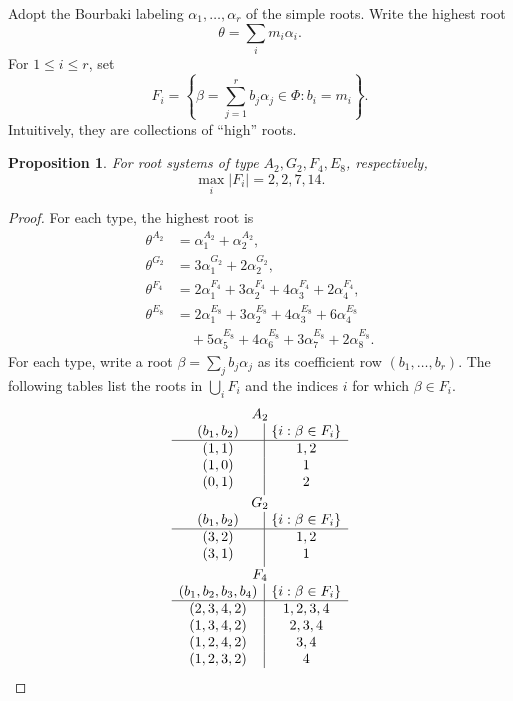 \documentclass[12pt]{article}
\newtheorem{proposition}[theorem]{Proposition}
\theoremstyle{definition}
\begin{document}
Adopt the Bourbaki labeling $\alpha_1,\ldots,\alpha_r$ of the simple roots. Write the highest root $$\theta=\sum_i m_i\alpha_i.$$ For $1\le i\le r$, set
\[
    F_i=\left\{\beta=\sum_{j=1}^r b_j\alpha_j\in\Phi:b_i=m_i\right\}.
\]
Intuitively, they are collections of ``high'' roots.
\begin{proposition}\label{rootcounts}
    For root systems of type $A_2,G_2,F_4,E_8$, respectively, $$\max_i|F_i|=2,2,7,14.$$
\end{proposition}
\begin{proof}
    For each type, the highest root is
    \[
    \begin{aligned}
        \theta^{A_2}
            &=\alpha_1^{A_2}+\alpha_2^{A_2},\\
        \theta^{G_2}
            &=3\alpha_1^{G_2}+2\alpha_2^{G_2},\\
        \theta^{F_4}
            &=2\alpha_1^{F_4}+3\alpha_2^{F_4}
              +4\alpha_3^{F_4}+2\alpha_4^{F_4},\\
        \theta^{E_8}
            &=2\alpha_1^{E_8}+3\alpha_2^{E_8}
              +4\alpha_3^{E_8}+6\alpha_4^{E_8}\\
            &\quad+5\alpha_5^{E_8}+4\alpha_6^{E_8}
              +3\alpha_7^{E_8}+2\alpha_8^{E_8}.
    \end{aligned}
    \]
    For each type, write a root $\beta=\sum_j b_j\alpha_j$ as its coefficient row $(b_1,\ldots,b_r)$. The following tables list the roots in $\bigcup_iF_i$ and the indices $i$ for which $\beta\in F_i$.
    {\small
    \[
    \begin{array}{c|c}
    \multicolumn{2}{c}{A_2}\\
    (b_1,b_2)&\{i:\beta\in F_i\}\\ \hline
    (1,1)&1,2\\
    (1,0)&1\\
    (0,1)&2\\[3pt]
    \multicolumn{2}{c}{G_2}\\
    (b_1,b_2)&\{i:\beta\in F_i\}\\ \hline
    (3,2)&1,2\\
    (3,1)&1\\[3pt]
    \multicolumn{2}{c}{F_4}\\
    (b_1,b_2,b_3,b_4)&\{i:\beta\in F_i\}\\ \hline
    (2,3,4,2)&1,2,3,4\\
    (1,3,4,2)&2,3,4\\
    (1,2,4,2)&3,4\\
    (1,2,3,2)&4\\

\end{array}\]}
\end{proof}
\end{document}
